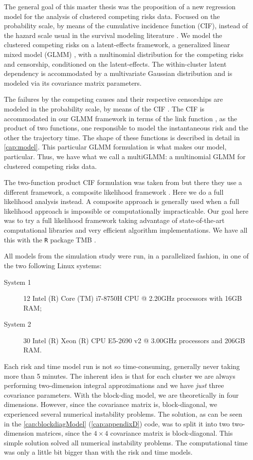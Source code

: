 The general goal of this master thesis was the proposition of a new
regression model for the analysis of clustered competing risks
data. Focused on the probability scale, by means of the cumulative
incidence function (CIF), instead of the hazard scale usual in the
survival modeling literature \cite{kalb&prentice}. We model the
clustered competing risks on a latent-effects framework, a generalized
linear mixed model (GLMM) \cite{GLMM}, with a multinomial distribution
for the competing risks and censorship, conditioned on the
latent-effects. The within-cluster latent dependency is accommodated by
a multivariate Gaussian distribution and is modeled via its covariance
matrix parameters.

The failures by the competing causes and their respective censorships
are modeled in the probability scale, by means of the CIF
\cite{kalb&prentice, andersen12}. The CIF is accommodated in our GLMM
framework in terms of the link function \cite{GLM89}, as the product of
two functions, one responsible to model the instantaneous risk and the
other the trajectory time. The shape of these functions is described in
detail in \autoref{cap:model}. This particular GLMM formulation is what
makes our model, particular. Thus, we have what we call a multiGLMM: a
multinomial GLMM for clustered competing risks data.

The two-function product CIF formulation was taken from
 but there they use a different framework, a
composite likelihood framework \cite{lindsay88, cox&reid04, varin11}.
Here we do a full likelihood analysis instead. A composite approach is
generally used when a full likelihood approach is impossible or
computationally impracticable. Our goal here was to try a full
likelihood framework taking advantage of state-of-the-art computational
libraries and very efficient algorithm implementations. We have all this
with the \texttt{R} \cite{R21} package TMB \cite{TMB}.

All models from the simulation study were run, in a parallelized
fashion, in one of the two following Linux systems:
\begin{description}
 \item[System 1]
  12 Intel (R) Core (TM) i7-8750H CPU @ 2.20GHz processors
  with 16GB RAM;
 \item[System 2]
  30 Intel (R) Xeon (R) CPU E5-2690 v2 @ 3.00GHz processors
  and 206GB RAM.
\end{description}

Each risk and time model run is not so time-consuming, generally never
taking more than 5 minutes. The inherent idea is that for each cluster
we are always performing two-dimension integral approximations and we
have \textit{just} three covariance parameters. With the block-diag
model, we are theoretically in four dimensions. However, since the
covariance matrix is, block-diagonal, we experienced several numerical
instability problems. The solution, as can be seen in the
\autoref{cap:blockdiagModel} (\autoref{cap:appendixD}) code, was to
split it into two two-dimension matrices, since the \(4\times4\)
covariance matrix is block-diagonal.  This simple solution solved all
numerical instability problems. The computational time was only a little
bit bigger than with the risk and time models.

